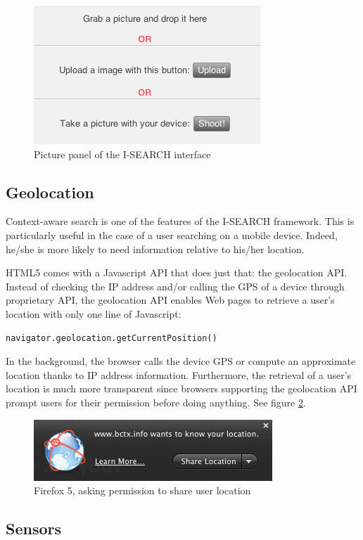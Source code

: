 \documentclass[runningheads,a4paper]{llncs} \usepackage[utf8]{inputenc}
\begin{document}
\begin{figure}[h!]
  \centering
    \includegraphics[width=0.3\linewidth]{resources/input-picture.png}
  \caption{Picture panel of the \mbox{I-SEARCH} interface}
  \label{fig:input-picture}
\end{figure}

\subsection{Geolocation}
Context-aware search is one of the features of the \mbox{I-SEARCH} framework.
This is particularly useful in the case of a user searching on a mobile device.
Indeed, he/she is more likely to need information relative to his/her location.

HTML5 comes with a Javascript API that does just that: the geolocation API.
Instead of checking the IP address and/or calling the GPS of a device through
proprietary API, the geolocation API enables Web pages to retrieve a user's
location with only one line of Javascript:
\begin{lstlisting}
navigator.geolocation.getCurrentPosition()
\end{lstlisting}
In the background, the browser calls the device GPS or compute an approximate
location thanks to IP address information. Furthermore, the retrieval of a
user's location is much more transparent since browsers supporting the
geolocation API prompt users for their permission before doing anything. See
figure \ref{fig:geolocation-prompt}.

\begin{figure}[h!]
  \centering
    \includegraphics[width=0.3\linewidth]{resources/geolocation-prompt.png}
  \caption{Firefox 5, asking permission to share user location}
  \label{fig:geolocation-prompt}
\end{figure}


\subsection{Sensors}
\end{document}
